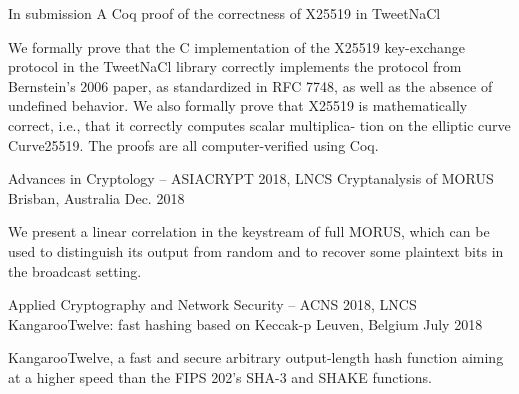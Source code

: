 {}


\begin{cventries}
    \cventry
      {In submission}
      {A Coq proof of the correctness of X25519 in TweetNaCl} %
      {} %
      {} %
      {
        \begin{cvitems} %
          \item {We formally prove that the C implementation of the X25519
key-exchange protocol in the TweetNaCl library correctly implements the protocol from Bernstein’s 2006 paper, as standardized in RFC 7748, as well
as the absence of undefined behavior. We also formally prove that X25519 is mathematically correct, i.e., that it correctly computes scalar multiplica-
tion on the elliptic curve Curve25519. The proofs are all computer-verified using Coq.}
        \end{cvitems}
      }

    \cventry
      {Advances in Cryptology – ASIACRYPT 2018, LNCS}
      {Cryptanalysis of MORUS} %
      {Brisban, Australia} %
      {Dec. 2018} %
      {
        \begin{cvitems} %
          \item {We present a linear correlation in the keystream of full MORUS, which can be used to distinguish its output from random and to recover some plaintext bits in the broadcast setting.}
        \end{cvitems}
      }

    \cventry
      {Applied Cryptography and Network Security – ACNS 2018, LNCS}
      {KangarooTwelve: fast hashing based on Keccak-p} %
      {Leuven, Belgium} %
      {July 2018} %
      {
        \begin{cvitems} %
          \item {KangarooTwelve, a fast and secure arbitrary output-length hash function aiming at a higher speed than the FIPS 202’s SHA-3 and SHAKE functions.}
        \end{cvitems}
      }


\end{cventries}
